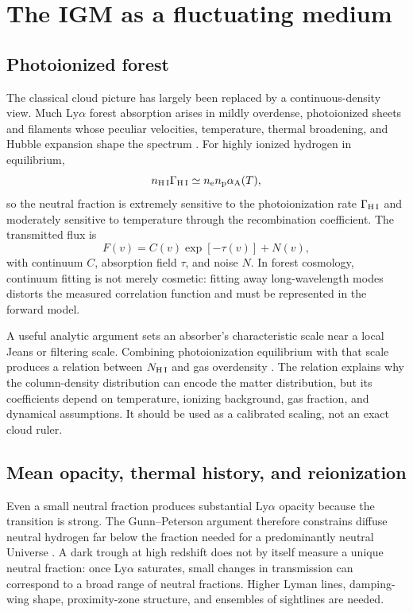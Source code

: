 \section{The IGM as a fluctuating medium}

\subsection{Photoionized forest}

The classical cloud picture has largely been replaced by a continuous-density
view. Much Ly$\alpha$ forest absorption arises in mildly overdense,
photoionized sheets and filaments whose peculiar velocities, temperature,
thermal broadening, and Hubble expansion shape the spectrum
\citep{Rauch1998,McQuinn2016}. For highly ionized hydrogen in equilibrium,
\begin{equation}
 n_{\rm H\,I}\Gamma_{\rm H\,I}
 \simeq n_{\rm e}n_{\rm p}\alpha_{\rm A}(T),
 \label{eq:photoequilibrium}
\end{equation}
so the neutral fraction is extremely sensitive to the photoionization rate
$\Gamma_{\rm H\,I}$ and moderately sensitive to temperature through the
recombination coefficient. The transmitted flux is
\begin{equation}
 F(v)=C(v)\exp[-\tau(v)]+N(v),
 \label{eq:forest-flux}
\end{equation}
with continuum $C$, absorption field $\tau$, and noise $N$. In forest
cosmology, continuum fitting is not merely cosmetic: fitting away
long-wavelength modes distorts the measured correlation function and must be
represented in the forward model.

A useful analytic argument sets an absorber's characteristic scale near a
local Jeans or filtering scale. Combining photoionization equilibrium with
that scale produces a relation between $N_{\rm H\,I}$ and gas overdensity
\citep{Schaye2001}. The relation explains why the column-density distribution
can encode the matter distribution, but its coefficients depend on
temperature, ionizing background, gas fraction, and dynamical assumptions.
It should be used as a calibrated scaling, not an exact cloud ruler.

\subsection{Mean opacity, thermal history, and reionization}

Even a small neutral fraction produces substantial Ly$\alpha$ opacity because
the transition is strong. The Gunn--Peterson argument therefore constrains
diffuse neutral hydrogen far below the fraction needed for a predominantly
neutral Universe \citep{GunnPeterson1965}. A dark trough at high redshift does
not by itself measure a unique neutral fraction: once Ly$\alpha$ saturates,
small changes in transmission can correspond to a broad range of neutral
fractions. Higher Lyman lines, damping-wing shape, proximity-zone structure,
and ensembles of sightlines are needed.

